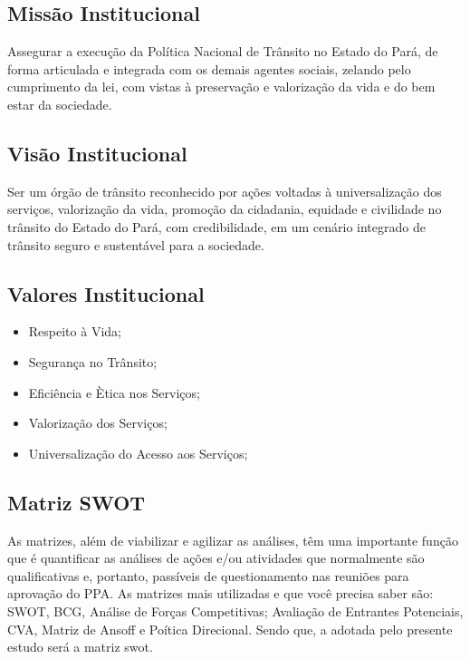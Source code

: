 \documentclass[a4paper]{article}
\begin{document}
\subsection{Missão Institucional}

Assegurar a execução da Política Nacional de Trânsito no Estado do Pará, de forma articulada e integrada com os demais agentes sociais, zelando pelo cumprimento da lei, com vistas à preservação e valorização da vida e do bem estar da sociedade.


\subsection{Visão Institucional}

Ser um órgão de trânsito reconhecido por ações voltadas à universalização dos serviços, valorização da vida, promoção da cidadania, equidade e civilidade no trânsito do Estado do Pará, com credibilidade, em um cenário integrado de trânsito seguro e sustentável para a sociedade.

\subsection{Valores Institucional}

\begin{itemize}
    \item Respeito à Vida; 
    \item Segurança no Trânsito;
    \item Eficiência e Ètica nos Serviços;
    \item Valorização dos Serviços;
    \item Universalização do Acesso aos Serviços;
\end{itemize}


\subsection{Matriz SWOT}

As matrizes, além de viabilizar e agilizar as análises, têm uma importante função que é quantificar as análises de ações e/ou atividades que normalmente são qualificativas e, portanto, passíveis de questionamento nas reuniões para aprovação do PPA. As matrizes mais utilizadas e que você precisa saber são: SWOT, BCG, Análise de Forças Competitivas; Avaliação de Entrantes Potenciais, CVA, Matriz de Ansoff e Poítica Direcional. Sendo que, a adotada pelo presente estudo será a matriz swot.\vskip0.3cm
 
\end{document}
